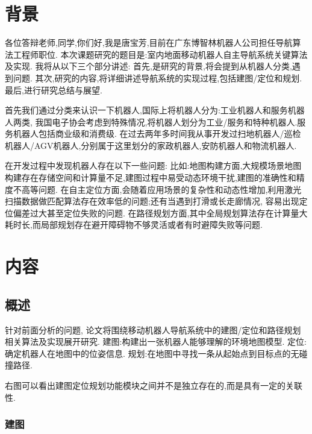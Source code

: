 \section{背景}
各位答辩老师,同学,你们好,我是唐宝芳,目前在广东博智林机器人公司担任导航算法工程师职位.
本次课题研究的题目是:室内地面移动机器人自主导航系统关键算法及实现.
我将从以下三个部分讲述:
首先,是研究的背景,将会提到从机器人分类,遇到问题.
其次,研究的内容,将详细讲述导航系统的实现过程,包括建图/定位和规划.
最后,进行研究总结与展望.

首先我们通过分类来认识一下机器人,国际上将机器人分为:工业机器人和服务机器人两类,
我国电子协会考虑到特殊情况,将机器人划分为工业/服务和特种机器人.服务机器人包括商业级和消费级.
在过去两年多时间我从事开发过扫地机器人/巡检机器人/AGV机器人,分别属于这里划分的家政机器人,安防机器人和物流机器人.


在开发过程中发现机器人存在以下一些问题:
比如:地图构建方面,大规模场景地图构建存在存储空间和计算量不足,建图过程中易受动态环境干扰,建图的准确性和精度不高等问题.
在自主定位方面,会随着应用场景的复杂性和动态性增加,利用激光扫描数据做匹配算法存在效率低的问题;还有当遇到打滑或长走廊情况,
容易出现定位偏差过大甚至定位失败的问题.
在路径规划方面,其中全局规划算法存在计算量大耗时长,而局部规划存在避开障碍物不够灵活或者有时避障失败等问题.


\section{内容}
\subsection{概述}
针对前面分析的问题,
论文将围绕移动机器人导航系统中的建图/定位和路径规划相关算法及实现展开研究.
建图:构建出一张机器人能够理解的环境地图模型.
定位:确定机器人在地图中的位姿信息.
规划:在地图中寻找一条从起始点到目标点的无碰撞路径.

右图可以看出建图定位规划功能模块之间并不是独立存在的,而是具有一定的关联性.




\subsubsection{建图}

